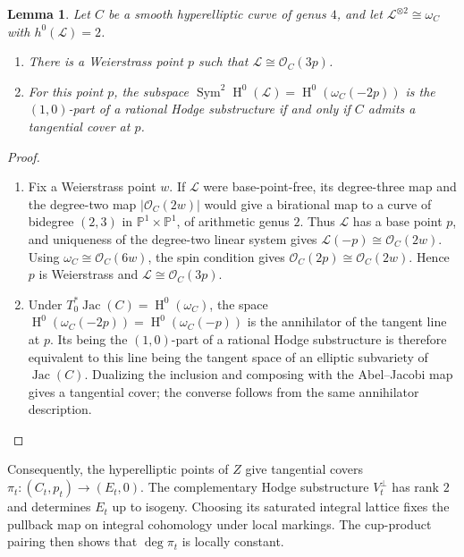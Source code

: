 \documentclass{amsart}
\newtheorem{lemma}{Lemma}[section]
\DeclareMathOperator{\Sym}{Sym}
\DeclareMathOperator{\Hnm}{H}
\DeclareMathOperator{\Jac}{Jac}
\begin{document}
\begin{lemma}\label{lem:hyperelliptic}
Let $C$ be a smooth hyperelliptic curve of genus $4$, and let
$\mathcal{L}^{\otimes2}\cong\omega_C$ with $h^0(\mathcal{L})=2$.
\begin{enumerate}
\item There is a Weierstrass point $p$ such that $\mathcal{L}\cong\mathcal{O}_C(3p)$.
\item For this point $p$, the subspace
$\Sym^2\Hnm^0(\mathcal{L})=\Hnm^0\left(\omega_C(-2p)\right)$ is the $(1,0)$-part of a rational
Hodge substructure if and only if $C$ admits a tangential cover at $p$.
\end{enumerate}
\end{lemma}

\begin{proof}\
\begin{enumerate}
\item Fix a Weierstrass point $w$. If $\mathcal{L}$ were base-point-free, its
degree-three map and the degree-two map $|\mathcal{O}_C(2w)|$ would give
a birational map to a curve of bidegree $(2,3)$ in
$\mathbb{P}^1\times\mathbb{P}^1$, of arithmetic genus $2$. Thus
$\mathcal{L}$ has a base point $p$, and uniqueness of the degree-two
linear system gives $\mathcal{L}(-p)\cong\mathcal{O}_C(2w)$.
Using $\omega_C\cong\mathcal{O}_C(6w)$, the spin condition gives
$\mathcal{O}_C(2p)\cong\mathcal{O}_C(2w)$. Hence $p$ is Weierstrass and
$\mathcal{L}\cong\mathcal{O}_C(3p)$. 

\item Under $T_0^*\Jac(C)=\Hnm^0(\omega_C)$, the space
$\Hnm^0\left(\omega_C(-2p)\right)=\Hnm^0\left(\omega_C(-p)\right)$
is the annihilator of the tangent line at $p$. Its being the $(1,0)$-part
of a rational Hodge substructure is therefore equivalent to this line
being the tangent space of an elliptic subvariety of $\Jac(C)$.
Dualizing the inclusion and composing with the Abel--Jacobi map gives
a tangential cover; the converse follows from the same annihilator
description.
\end{enumerate}
\end{proof}

Consequently, the hyperelliptic points of $Z$ give tangential covers
$\pi_t:(C_t,p_t)\longrightarrow(E_t,0)$. The complementary Hodge
substructure $V_t^\perp$ has rank $2$ and determines $E_t$ up to isogeny.
Choosing its saturated integral lattice fixes the pullback map on
integral cohomology under local markings. The cup-product pairing then
shows that $\deg\pi_t$ is locally constant.
\end{document}

